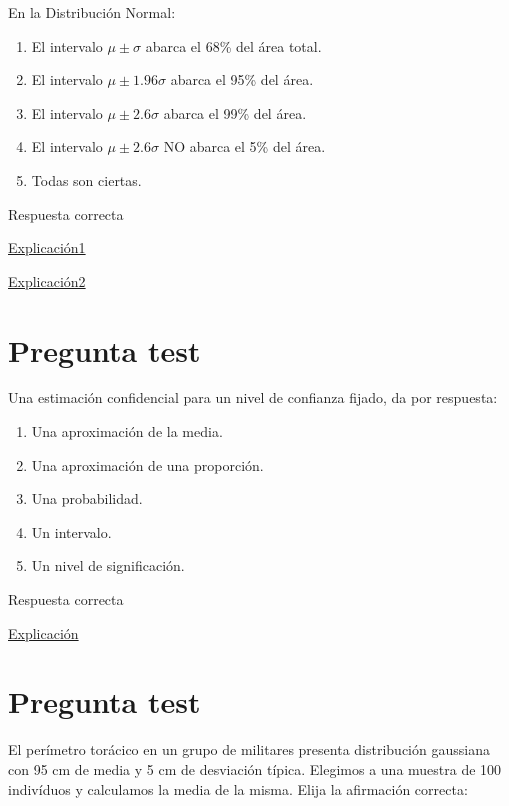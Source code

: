 \documentclass[
]{book}
\providecommand{\tightlist}{%
  \setlength{\itemsep}{0pt}\setlength{\parskip}{0pt}}
\begin{document}
En la Distribución Normal:

\begin{enumerate}
\def\labelenumi{\alph{enumi})}
\tightlist
\item
  El intervalo \(\mu \pm \sigma\) abarca el 68\% del área total.
\item
  El intervalo \(\mu \pm 1.96 \sigma\) abarca el 95\% del área.
\item
  El intervalo \(\mu \pm 2.6\sigma\) abarca el 99\% del área.
\item
  El intervalo \(\mu \pm 2.6\sigma\) NO abarca el 5\% del área.
\item
  Todas son ciertas.
\end{enumerate}

Respuesta correcta

\href{https://1fjmanzano.github.io/bioestadistica/distribuciones-de-probabilidad.html\#distribucio\%CC\%81n-normal}{Explicación1}

\href{https://youtu.be/wWeogWp_bO8}{Explicación2}

\hypertarget{pregunta-test-96}{%
\section{Pregunta test}\label{pregunta-test-96}}

Una estimación confidencial para un nivel de confianza fijado, da por respuesta:

\begin{enumerate}
\def\labelenumi{\alph{enumi})}
\tightlist
\item
  Una aproximación de la media.
\item
  Una aproximación de una proporción.
\item
  Una probabilidad.
\item
  Un intervalo.
\item
  Un nivel de significación.
\end{enumerate}

Respuesta correcta

\href{https://1fjmanzano.github.io/bioestadistica/estimacio\%CC\%81n-de-para\%CC\%81metros.-intervalos-de-confianza.html}{Explicación}

\hypertarget{pregunta-test-97}{%
\section{Pregunta test}\label{pregunta-test-97}}

El perímetro torácico en un grupo de militares presenta distribución gaussiana con 95 cm de media y 5 cm de desviación típica. Elegimos a una muestra de 100 indivíduos y calculamos la media de la misma. Elija la afirmación correcta:
\end{document}
